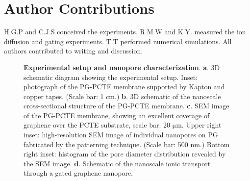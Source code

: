 \section{Author Contributions}
\label{sec:np-np-author-contrib}

H.G.P and C.J.S conceived the experiments. R.M.W and K.Y. measured the ion
diffusion and gating experiments. T.T performed numerical
simulations. All authors contributed to writing and discussion.



\begin{figure}[H]
  \centering
  \caption{\textbf{Experimental setup and nanopore characterization}.
    \textbf{a}. 3D schematic diagram showing the experimental
    setup. Inset: photograph of the PG-PCTE membrane supported by
    Kapton and copper tapes. (Scale bar: 1 cm.) \textbf{b}. 3D schematic
    of the nanoscale cross-sectional structure of the PG-PCTE
    membrane. \textbf{c}. SEM image of the PG-PCTE membrane, showing an
    excellent coverage of graphene over the PCTE substrate, scale bar:
    20 $\mathrm{\mu}$m.  Upper right inset: high-resolution SEM image
    of individual nanopores on PG fabricated by the patterning
    technique. (Scale bar: 500 nm.) Bottom right inset: histogram of the
    pore diameter distribution revealed by the SEM
    image. \textbf{d}. Schematic of the nanoscale ionic transport
    through a gated graphene nanopore.}
  \label{fig:np-1}
\end{figure}

